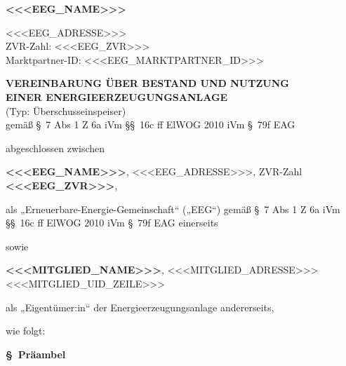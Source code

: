 \documentclass[a4paper,11pt]{article}
\newcounter{parasec}
\newcounter{parasubsec}[parasec]
\newcommand{\parasec}[1]{%
  \stepcounter{parasec}%
  \setcounter{parasubsec}{0}%
  \par\Needspace*{5\baselineskip}%
  \bigskip
  {\large\bfseries\color{tuerkis}\S\ \theparasec\quad #1}\par\nopagebreak
  \smallskip\nopagebreak
}
\begin{document}
\noindent
\begin{minipage}[t]{0.55\textwidth}
  \raggedright{}
  {\LARGE\bfseries\color{tuerkis}<<<EEG_NAME>>>\par}
\end{minipage}%
\begin{minipage}[t]{0.45\textwidth}
  \raggedleft
  \small
  <<<EEG_ADRESSE>>>\\
  ZVR-Zahl: <<<EEG_ZVR>>>\\
  Marktpartner-ID: <<<EEG_MARKTPARTNER_ID>>>
\end{minipage}

\bigskip
{}

\bigskip

\begin{center}
  {\Large\bfseries VEREINBARUNG ÜBER BESTAND UND NUTZUNG}\\[0.2em]
  {\Large\bfseries EINER ENERGIEERZEUGUNGSANLAGE}\\[0.3em]
  {\normalsize (Typ: Überschusseinspeiser)}\\[0.5em]
  {\small gemäß \S\ 7 Abs 1 Z 6a iVm \S\S\ 16c ff ElWOG 2010 iVm \S\ 79f EAG}
\end{center}

\bigskip

\noindent abgeschlossen zwischen

\bigskip

\noindent \textbf{<<<EEG_NAME>>>}, <<<EEG_ADRESSE>>>, ZVR-Zahl \textbf{<<<EEG_ZVR>>>},

\smallskip
\noindent als „Erneuerbare-Energie-Gemeinschaft“ („EEG“) gemäß \S\ 7 Abs 1 Z 6a iVm \S\S\ 16c ff ElWOG 2010 iVm \S\ 79f EAG einerseits

\bigskip
\noindent sowie

\bigskip
\noindent \textbf{<<<MITGLIED_NAME>>>}, <<<MITGLIED_ADRESSE>>>\\
<<<MITGLIED_UID_ZEILE>>>

\smallskip
\noindent als „Eigentümer:in“ der Energieerzeugungsanlage andererseits,

\bigskip
\noindent wie folgt:

\parasec{Präambel}
\end{document}

